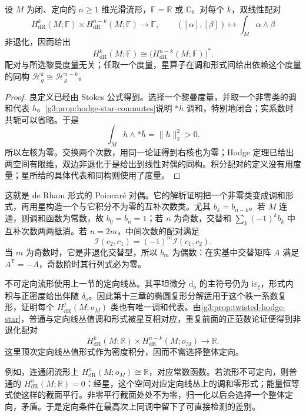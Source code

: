 \begin{theorem}\label{g3:thm:hodge-poincare-duality}
	设 \(M\) 为闭、定向的 \(n\ge1\) 维光滑流形，\(\mathbb F=\mathbb R\) 或 \(\mathbb C\)。对每个 \(k\)，双线性配对
	\begin{equation}\label{g3:eq:de-rham-duality-pairing}
		H_{\mathrm{dR}}^k(M;\mathbb F)
		\times H_{\mathrm{dR}}^{n-k}(M;\mathbb F)
		\longrightarrow\mathbb F,\qquad
		([\alpha],[\beta])\longmapsto\int_M\alpha\wedge\beta
	\end{equation}
	非退化，因而给出
	\[
		H_{\mathrm{dR}}^k(M;\mathbb F)
		\cong \bigl(H_{\mathrm{dR}}^{n-k}(M;\mathbb F)\bigr)^*.
	\]
	配对与所选黎曼度量无关；任取一个度量，星算子在调和形式间给出依赖这个度量的同构 \(\mathcal H_g^k\cong\mathcal H_g^{n-k}\)。
\end{theorem}
\begin{proof}
	良定义已经由 Stokes 公式得到。选择一个黎曼度量，并取一个非零类的调和代表 \(h\)。\cref{g3:prop:hodge-star-commutes}说明 \(*\overline h\) 调和，特别地闭合；实系数时共轭可以省略。于是
	\[
		\int_M h\wedge *\overline h
		=\|h\|_2^2>0.
	\]
	所以左核为零。交换两个次数，用同一论证得到右核也为零；Hodge 定理已给出两空间有限维，双边非退化于是给出到线性对偶的同构。积分配对的定义没有用度量；星所给的具体代表和同构则使用了度量。
\end{proof}

这就是 de Rham 形式的 Poincaré 对偶。它的解析证明把一个非零类变成调和形式，再用星构造一个与它积分不为零的互补次数类。尤其 \(b_k=b_{n-k}\)。若 \(M\) 连通，则调和函数为常数，故 \(b_0=b_n=1\)；若 \(n\) 为奇数，交替和 \(\sum_k(-1)^k b_k\) 中互补次数两两抵消。若 \(n=2m\)，中间次数的配对满足
\[
	\mathcal I(c_2,c_1)=(-1)^m\mathcal I(c_1,c_2).
\]
当 \(m\) 为奇数时，它是非退化交替型，所以 \(b_m\) 为偶数：在实基中交替矩阵 \(A\) 满足 \(A^{\mathsf T}=-A\)，奇数阶时其行列式必为零。

\ProseParagraphBreak

不可定向流形使用上一节的定向线丛。其平坦微分 \(\mathrm d_o\) 的主符号仍为 \(\mathrm i\varepsilon_\xi\)，形式内积与正密度给出伴随 \(\delta_o\)。因此第十三章的椭圆复形分解适用于这个秩一系数复形，证明每个 \(H_{\mathrm{dR}}^j(M;o_M)\) 类也有唯一调和代表。由\cref{g3:prop:twisted-hodge-star}，普通与定向线丛值调和形式被星互相对应，重复前面的正范数论证便得到非退化配对
\begin{equation}\label{g3:eq:twisted-poincare-pairing}
	H_{\mathrm{dR}}^k(M;\mathbb R)
	\times H_{\mathrm{dR}}^{n-k}(M;o_M)
	\longrightarrow\mathbb R.
\end{equation}
这里顶次定向线丛值形式作为密度积分，因而不需选择整体定向。

\ProseParagraphBreak

例如，连通闭流形上 \(H_{\mathrm{dR}}^n(M;o_M)\cong\mathbb R\)，对应常数函数。若流形不可定向，则普通的 \(H_{\mathrm{dR}}^n(M;\mathbb R)=0\)：经星，这个空间对应定向线丛上的调和零形式；能量恒等式使这样的截面平行。非零平行截面处处不为零，归一化以后会选择一个整体定向，矛盾。于是定向条件在最高次上同调中留下了可直接检测的差别。
